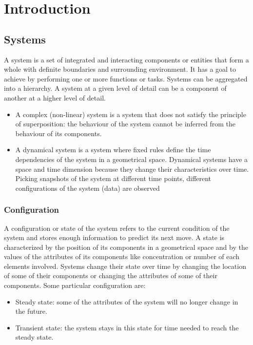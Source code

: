\graphicspath{{chapters/07/images/}}
\chapter{Introduction}

\section{Systems}
A system is a set of integrated and interacting components or entities that form a whole with definite boundaries and surrounding environment.
It has a goal to achieve by performing one or more functions or tasks.
Systems can be aggregated into a hierarchy.
A system at a given level of detail can be a component of another at a higher level of detail.

\begin{multicols}{2}
  \begin{itemize}
    \item A complex (non-linear) system is a system that does not satisfy the principle of superposition: the behaviour of the system cannot be inferred from the behaviour of its components.
    \item A dynamical system is a system where fixed rules define the time dependencies of the system in a geometrical space.
      Dynamical systems have a space and time dimension because they change their characteristics over time.
      Picking snapshots of the system at different time points, different configurations of the system (data) are observed
  \end{itemize}
\end{multicols}

  \subsection{Configuration}
  A configuration or state of the system refers to the current condition of the system and stores enough information to predict its next move.
  A state is characterized by the position of its components in a geometrical space and by the values of the attributes of its components like concentration or number of each elements involved.
  Systems change their state over time by changing the location of some of their components or changing the attributes of some of their components.
  Some particular configuration are:

  \begin{multicols}{2}
    \begin{itemize}
      \item Steady state: some of the attributes of the system will no longer change in the future.
      \item Transient state: the system stays in this state for time needed to reach the steady state.
    \end{itemize}
  \end{multicols}


